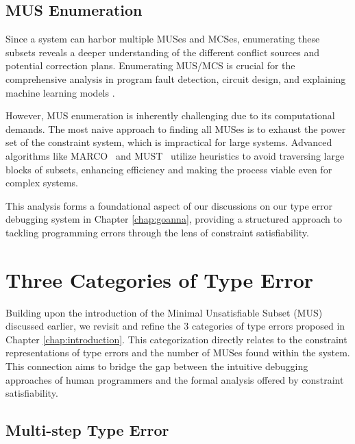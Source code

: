 \subsection{MUS Enumeration}

Since a system can harbor multiple MUSes and MCSes, enumerating these subsets reveals a deeper understanding of the different conflict sources and potential correction plans. Enumerating MUS/MCS is crucial for the comprehensive analysis in program fault detection\cite{Bekkouche2015-is}, circuit design\cite{Gaber2022-te}, and explaining machine learning models \cite{Marques-Silva2023-nk}.

However, MUS enumeration is inherently challenging due to its computational demands. The most naive approach to finding all MUSes is to exhaust the power set of the constraint system, which is impractical for large systems. Advanced algorithms like MARCO~\cite{Liffiton2016-xi} and MUST~\cite{Bendik2020-pz} utilize heuristics to avoid traversing large blocks of subsets, enhancing efficiency and making the process viable even for complex systems.

This analysis forms a foundational aspect of our discussions on our type error debugging system in Chapter \ref{chap:goanna}, providing a structured approach to tackling programming errors through the lens of constraint satisfiability.

\section{Three Categories of Type Error}

Building upon the introduction of the Minimal Unsatisfiable Subset (MUS) discussed earlier, we revisit and refine the 3 categories of type errors proposed in Chapter \ref{chap:introduction}. This categorization directly relates to the constraint representations of type errors and the number of MUSes found within the system. This connection aims to bridge the gap between the intuitive debugging approaches of human programmers and the formal analysis offered by constraint satisfiability.

\subsection{Multi-step Type Error}


